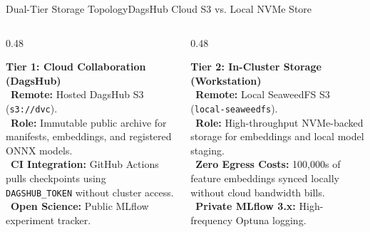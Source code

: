 \documentclass[aspectratio=169,10pt]{beamer}
\begin{document}
\begin{frame}{Dual-Tier Storage Topology}{DagsHub Cloud S3 vs. Local NVMe Store}
    \begin{columns}[T]
        \begin{column}{0.48\textwidth}
            \begin{bluecard}
                \textbf{\color{BlueAccent} Tier 1: Cloud Collaboration (DagsHub)}\\[3pt]
                \textbullet\ \textbf{Remote:} Hosted DagsHub S3 (\texttt{s3://dvc}).\\[2pt]
                \textbullet\ \textbf{Role:} Immutable public archive for manifests, embeddings, and registered ONNX models.\\[2pt]
                \textbullet\ \textbf{CI Integration:} GitHub Actions pulls checkpoints using \texttt{DAGSHUB\_TOKEN} without cluster access.\\[2pt]
                \textbullet\ \textbf{Open Science:} Public MLflow experiment tracker.
            \end{bluecard}
        \end{column}
        \begin{column}{0.48\textwidth}
            \begin{greencard}
                \textbf{\color{GreenAccent} Tier 2: In-Cluster Storage (Workstation)}\\[3pt]
                \textbullet\ \textbf{Remote:} Local SeaweedFS S3 (\texttt{local-seaweedfs}).\\[2pt]
                \textbullet\ \textbf{Role:} High-throughput NVMe-backed storage for embeddings and local model staging.\\[2pt]
                \textbullet\ \textbf{Zero Egress Costs:} 100,000s of feature embeddings synced locally without cloud bandwidth bills.\\[2pt]
                \textbullet\ \textbf{Private MLflow 3.x:} High-frequency Optuna logging.
            \end{greencard}
        \end{column}
    \end{columns}
\end{frame}
\end{document}
